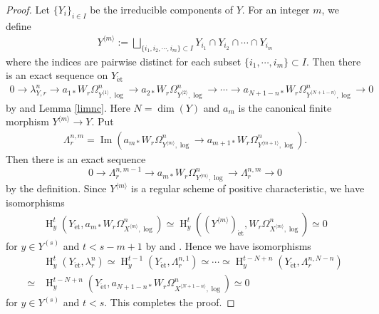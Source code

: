 \documentclass{article}
\newcommand{\et}{\mathrm{\acute{e}t}}
\newcommand{\HO}{\operatorname{H}}
\begin{document}
%
\begin{proof}\upshape
Let $\{Y_{i}\}_{i\in I}$
be the irreducible components of $Y$. For an 
integer $m$, we define
%
\begin{align*}
Y^{
\langle m\rangle
}
:=
\bigsqcup
_{
\{i_{1}, i_{2}, \cdots, i_{m}
\}
\subset
I
}
Y_{i_{1}}\cap
Y_{i_{2}}\cap
\cdots
\cap
Y_{i_{m}}
\end{align*}
%
where 
the indices are pairwise distinct
for each subset
$\{i_{1}, \cdots, i_{m}\}\subset I$.
Then
there is an exact sequence on $Y_{\et}$
%
\begin{align*}
0\to   
\lambda^{n}_{Y, r}
\to
a_{1*}W_{r}\Omega^{n}_{Y^{\langle 1\rangle}, \log}
\to
a_{2*}W_{r}\Omega^{n}_{Y^{\langle 2\rangle}, \log}
\to
\cdots
\to
a_{N+1-n*}W_{r}\Omega^{n}_{Y^{\langle N+1-n\rangle}, \log}
\to 0
\end{align*}
%
by \cite[p.727, Proposition 3.2.1]{SaL} and Lemma \ref{limnc}.
Here 
$N=\operatorname{dim}(Y)$ and
$a_{m}$ is the canonical finite morphism
$Y^{\langle m\rangle}\to Y$. 
Put
%
\begin{align*}
\Lambda^{n, m}_{r}
=
\operatorname{Im}\left(
a_{m*}W_{r}\Omega^{n}_{Y^{\langle m\rangle}, \log}
\to
a_{m+1*}W_{r}\Omega^{n}_{Y^{\langle m+1\rangle}, \log}
\right).
\end{align*}
%
Then there is an exact sequence
%
\begin{equation*}
0\to
\Lambda^{n, m-1}_{r}
\to
a_{m*}W_{r}\Omega^{n}_{Y^{\langle m\rangle}, \log}
\to
\Lambda^{n, m}_{r}
\to 
0
\end{equation*}
%
by the definition.
Since $Y^{\langle m\rangle}$ is a regular scheme of positive characteristic, 
we have isomorphisms
%
\begin{align*}
\HO^{t}_{y}(
Y_{\et}, 
a_{m*}W_{r}\Omega^{n}_{X^{\langle m\rangle}, \log}
)
\simeq
\HO^{t}_{y}(
(Y^{\langle m\rangle})_{\et},
W_{r}\Omega^{n}_{X^{\langle m\rangle}, \log}
)
\simeq
0
\end{align*}
%
for $y\in Y^{(s)}$ and $t<s-m+1$
by
\cite[Lemma 3.7]{Sak5} and
\cite[p.584, Corollary 3.4]{Sh}.
Hence we have isomorphisms
%
\begin{align*}
&\HO^{t}_{y}(
Y_{\et},
\lambda^{n}_{r}
)
\simeq
\HO^{t-1}_{y}(
Y_{\et},
\Lambda^{n, 1}_{r}
)
\simeq
\cdots
\simeq
\HO^{t-N+n}_{y}(
Y_{\et},
\Lambda^{n, N-n}_{r}
)
\\
\simeq
&\HO^{t-N+n}_{y}(
Y_{\et},
a_{N+1-n *}W_{r}\Omega_{X^{\langle N+1-n\rangle}, \log}^{n}
)
\simeq 
0
\end{align*}
%
for $y\in Y^{(s)}$ and $t<s$.
This completes the proof.
\end{proof}
%
%
\end{document}
